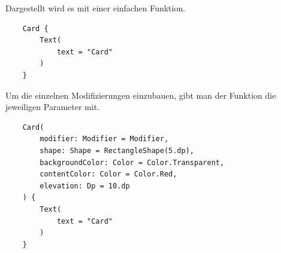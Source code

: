 Dargestellt wird es mit einer einfachen Funktion.


\begin{lstlisting}
    Card {
        Text(
            text = "Card"
        )
    }
\end{lstlisting}

Um die einzelnen Modifizierungen einzubauen, gibt man der Funktion die jeweiligen Parameter mit.

\begin{lstlisting}
    Card(
        modifier: Modifier = Modifier,
        shape: Shape = RectangleShape(5.dp),
        backgroundColor: Color = Color.Transparent,
        contentColor: Color = Color.Red,
        elevation: Dp = 10.dp
    ) {
        Text(
            text = "Card"
        )
    }
\end{lstlisting}





